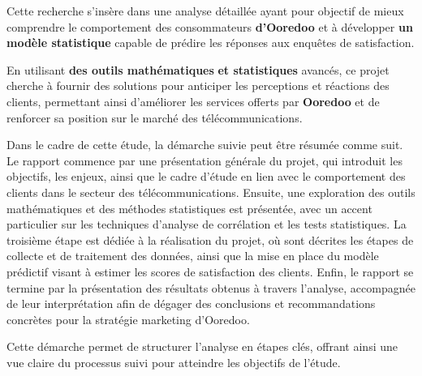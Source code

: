Cette recherche s'insère dans une analyse détaillée ayant pour objectif de mieux comprendre le comportement des consommateurs \textbf{d'Ooredoo} et à développer \textbf{un modèle statistique} capable de prédire les réponses aux enquêtes de satisfaction.\par

En utilisant \textbf{des outils mathématiques} \textbf{et statistiques} avancés, ce projet cherche à fournir des solutions pour anticiper les perceptions et réactions des clients, permettant ainsi d'améliorer les services offerts par \textbf{Ooredoo} et de renforcer sa position sur le marché des télécommunications.\par

Dans le cadre de cette étude, la démarche suivie peut être résumée comme suit. Le rapport commence par une présentation générale du projet, qui introduit les objectifs, les enjeux, ainsi que le cadre d'étude en lien avec le comportement des clients dans le secteur des télécommunications. Ensuite, une exploration des outils mathématiques et des méthodes statistiques est présentée, avec un accent particulier sur les techniques d'analyse de corrélation et les tests statistiques. La troisième étape est dédiée à la réalisation du projet, où sont décrites les étapes de collecte et de traitement des données, ainsi que la mise en place du modèle prédictif visant à estimer les scores de satisfaction des clients. Enfin, le rapport se termine par la présentation des résultats obtenus à travers l'analyse, accompagnée de leur interprétation afin de dégager des conclusions et recommandations concrètes pour la stratégie marketing d'Ooredoo.

Cette démarche permet de structurer l'analyse en étapes clés, offrant ainsi une vue claire du processus suivi pour atteindre les objectifs de l'étude.









